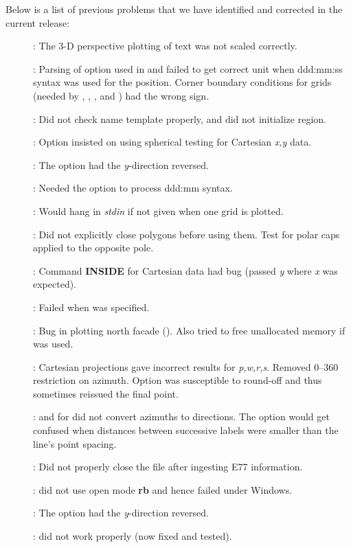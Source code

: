 Below is a list of previous problems
that we have identified and corrected in the current release:

\begin{description}
\item []: The 3-D perspective plotting of text was not scaled correctly.
\item []: Parsing of  option used in  and 
failed to get correct unit when ddd:mm:ss syntax was used for the position. Corner boundary conditions for grids (needed
by , , , and ) had the wrong sign.
\item []: Did not check name template properly, and did not initialize region.
\item []: Option  insisted on using spherical testing for Cartesian {\it x,y} data.
\item []: The  option had the {\it y}-direction reversed.
\item []: Needed the  option to process ddd:mm syntax.
\item []: Would hang in {\it stdin} if  not given when one grid is plotted.
\item []: Did not explicitly close polygons before using them.  Test for polar caps applied to the opposite pole.
\item []: Command {\bf INSIDE} for Cartesian data had bug (passed {\it y} where {\it x} was expected).
\item []: Failed when  was specified.
\item []: Bug in plotting north facade ().  Also tried to free unallocated memory if  was used.
\item []: Cartesian projections gave incorrect results for {\it p,w,r,s}.
Removed 0--360 restriction on azimuth.  Option  was susceptible to round-off and thus
sometimes reissued the final point.
\item []:  and  for  did not convert azimuths to directions.
The  option would get confused when distances between successive labels were smaller than the line's point spacing.
\item []: Did not properly close the file after ingesting E77 information.
\item []:  did not use open mode {\bf rb} and hence failed under Windows.
\item []: The  option had the {\it y}-direction reversed.
\item []:  did not work properly (now fixed and tested).
\end{description}


